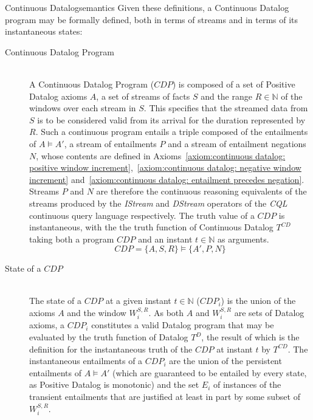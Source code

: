 \begin{nestedsection}{Continuous Datalog}{semantics}
	Given these definitions, a Continuous Datalog program may be formally defined, both in terms of streams and in terms of its instantaneous states:
	\begin{description}
		\item[Continuous Datalog Program\label{def:continuous datalog: CDP}]\hfill\\
			A Continuous Datalog Program (${CDP}$) is composed of a set of Positive Datalog axioms $A$, a set of streams of facts $S$ and the range ${R \in \mathbb{N}}$ of the windows over each stream in $S$.
			This specifies that the streamed data from $S$ is to be considered valid from its arrival for the duration represented by $R$.
			Such a continuous program entails a triple composed of the entailments of ${A \vDash A'}$, a stream of entailments $P$ and a stream of entailment negations $N$, whose contents are defined in Axioms~\ref{axiom:continuous datalog: positive window increment},~\ref{axiom:continuous datalog: negative window increment} and~\ref{axiom:continuous datalog: entailment precedes negation}.
			Streams $P$ and $N$ are therefore the continuous reasoning equivalents of the streams produced by the \emph{IStream} and \emph{DStream} operators of the \emph{CQL} continuous query language \citep{CQL} respectively.
			The truth value of a ${CDP}$ is instantaneous, with the the truth function of Continuous Datalog $T^{CD}$ taking both a program ${CDP}$ and an instant ${t \in \mathbb{N}}$ as arguments.
			\begin{equation*}
				CDP = \{A,S,R\} \vDash \{A',P,N\}
			\end{equation*}
		\item[State of a ${CDP}$\label{def:continuous datalog: CDPt}]\hfill\\
			The state of a ${CDP}$ at a given instant ${t \in \mathbb{N}}$ (${CDP_{i}}$) is the union of the axioms $A$ and the window $W^{S,R}_{i}$.
			As both $A$ and $W^{S,R}_{i}$ are sets of Datalog axioms, a ${CDP_{i}}$ constitutes a valid Datalog program that may be evaluated by the truth function of Datalog $T^{D}$, the result of which is the definition for the instantaneous truth of the ${CDP}$ at instant $t$ by $T^{CD}$.
			The instantaneous entailments of a $CDP_{i}$ are the union of the persistent entailments of ${A \vDash A'}$ (which are guaranteed to be entailed by every state, as Positive Datalog is monotonic) and the set $E_{i}$ of instances of the transient entailments that are justified at least in part by some subset of $W^{S,R}_{i}$. 
			\begin{equation*}

\end{equation*}
\end{description}
\end{nestedsection}
